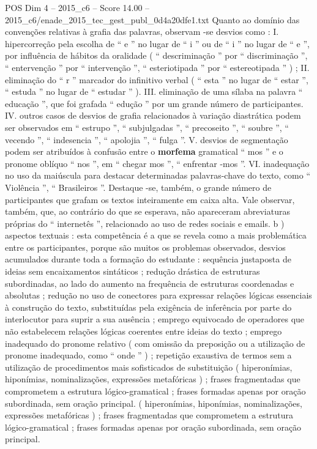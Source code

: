 \begin{textsample}{POS Dim 4 – 2015\_c6 – Score 14.00 – 2015\_c6/enade\_2015\_tec\_gest\_publ\_0d4a20dfe1.txt}
Quanto ao domínio das convenções relativas à grafia das palavras, observam -se desvios como : I. hipercorreção pela escolha de “ e ” no lugar de “ i ” ou de “ i ” no lugar de “ e ”, por influência de hábitos da oralidade ( “ descriminação ” por “ discriminação ”, “ entervenção ” por “ intervenção ”, “ esteriotipada ” por “ estereotipada ” ) ; II. eliminação do “ r ” marcador do infinitivo verbal ( “ esta ” no lugar de “ estar ”, “ estuda ” no lugar de “ estudar ” ).
III. eliminação de uma sílaba na palavra “ educação ”, que foi grafada “ edução ” por um grande número de participantes.
IV. outros casos de desvios de grafia relacionados à variação diastrática podem ser observados em “ estrupo ”, “ subjulgadas ”, “ precoseito ”, “ soubre ”, “ vecendo ”, “ indesencia ”, “ apolojia ”, “ fulga ”.
V. desvios de segmentação podem ser atribuídos à confusão entre o \textbf{morfema} gramatical “ mos ” e o pronome oblíquo “ nos ”, em “ chegar mos ”, “ enfrentar -mos ”.
VI. inadequação no uso da maiúscula para destacar determinadas palavras-chave do texto, como “ Violência ”, “ Brasileiros ”.
Destaque -se, também, o grande número de participantes que grafam os textos inteiramente em caixa alta.
Vale observar, também, que, ao contrário do que se esperava, não apareceram abreviaturas próprias do “ internetês ”, relacionado ao uso de redes sociais e emails. b ) aspectos textuais : esta competência é a que se revela como a mais problemática entre os participantes, porque são muitos os problemas observados, desvios acumulados durante toda a formação do estudante : sequência justaposta de ideias sem encaixamentos sintáticos ; redução drástica de estruturas subordinadas, ao lado do aumento na frequência de estruturas coordenadas e absolutas ; redução no uso de conectores para expressar relações lógicas essenciais à construção do texto, substituídas pela exigência de inferência por parte do interlocutor para suprir a sua ausência ; emprego equivocado de operadores que não estabelecem relações lógicas coerentes entre ideias do texto ; emprego inadequado do pronome relativo ( com omissão da preposição ou a utilização de pronome inadequado, como “ onde ” ) ; repetição exaustiva de termos sem a utilização de procedimentos mais sofisticados de substituição ( hiperonímias, hiponímias, nominalizações, expressões metafóricas ) ; frases fragmentadas que comprometem a estrutura lógico-gramatical ; frases formadas apenas por oração subordinada, sem oração principal. ( hiperonímias, hiponímias, nominalizações, expressões metafóricas ) ; frases fragmentadas que comprometem a estrutura lógico-gramatical ; frases formadas apenas por oração subordinada, sem oração principal.

\end{textsample}
